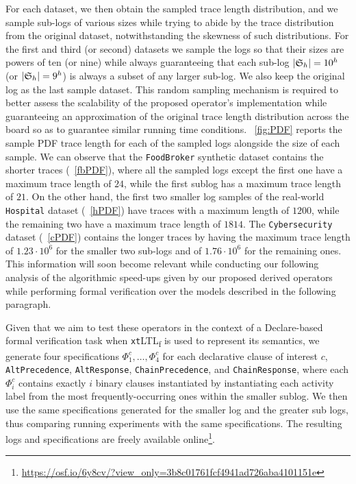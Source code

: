 \documentclass[sigconf]{acmart}
\begin{document}
For each dataset, we then obtain the sampled trace length distribution, and we sample sub-logs of various sizes while trying to abide by the trace distribution from the original dataset, notwithstanding the skewness of such distributions. For the first and third (or second) datasets we sample the logs so that their sizes are powers of ten (or nine) while always guaranteeing that each sub-log $|\mathfrak{S}_h|=10^h$ (or $|\mathfrak{S}_h|=9^h$) is always a subset of any larger sub-log. We also keep the original log as the last sample dataset. This random sampling mechanism is required to better assess the scalability of the proposed operator's implementation while guaranteeing an approximation of the original trace length distribution across the board so as to guarantee similar running time conditions. \figurename~\ref{fig:PDF} reports the sample PDF trace length for each of the sampled logs alongside the size of each sample. We can observe that the \texttt{FoodBroker} synthetic dataset contains the shorter traces (\figurename~\ref{fbPDF}), where all the sampled logs except the first one have a maximum trace length of $24$, while the first sublog has a maximum trace length of $21$. On the other hand, the first two smaller log samples of the real-world \texttt{Hospital} dataset (\figurename~\ref{hPDF}) have traces with a maximum length of $1200$, while the remaining two have a maximum trace length of $1814$. The \texttt{Cybersecurity} dataset (\figurename ~\ref{cPDF}) contains the longer traces by having the maximum trace length of $1.23\cdot10^6$ for the smaller two sub-logs and of $1.76\cdot 10^6$ for the remaining ones. This information will soon become relevant while conducting our following analysis of the algorithmic speed-ups given by our proposed derived operators while performing formal verification over the models described in the following paragraph.


 Given that we aim to test these operators in the context of a Declare-based formal verification task when \texttt{xt}LTL\textsubscript{f} is used to represent its semantics, we generate four specifications $\Phi^c_1,\dots,\Phi^c_4$ for each declarative clause of interest $c$, \texttt{AltPrecedence}, \texttt{AltResponse}, \texttt{ChainPrecedence}, and \texttt{ChainResponse}, where each $\Phi^c_i$ contains exactly $i$ binary clauses instantiated by instantiating each activity label from the most frequently-occurring ones within the smaller sublog. We then use the same specifications generated for the smaller log and the greater sub logs, thus comparing running experiments with the same specifications. The resulting logs and specifications are freely available online\footnote{\url{https://osf.io/6y8cv/?view_only=3b8c01761fcf4941ad726aba4101151e}}. \medskip
\end{document}
